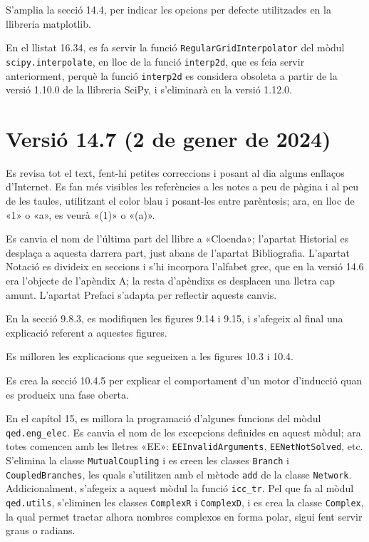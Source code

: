 S'amplia la secció 14.4, per indicar les opcions per defecte utilitzades en la llibreria matplotlib.

En el llistat 16.34, es fa servir la funció \texttt{RegularGridInterpolator} del mòdul \texttt{scipy.interpolate}, en lloc de la funció \texttt{interp2d}, que es feia servir anteriorment, perquè la funció \texttt{interp2d} es considera obsoleta a partir de la versió 1.10.0 de la llibreria SciPy, i s'eliminarà en la versió 1.12.0.


\section*{Versió 14.7 (2 de gener de 2024)}

Es revisa tot el text, fent-hi petites correccions i posant al dia alguns enllaços d'Internet. Es fan més visibles les referències a les notes a peu de pàgina i al peu de les taules, utilitzant el color blau i posant-les entre parèntesis; ara, en lloc de {\footnotesize«1»} o {\footnotesize«a»}, es veurà {\footnotesize\color{blue}«(1)»} o {\footnotesize\color{blue}«(a)»}.

Es canvia el nom de l'última part del llibre a «Cloenda»; l'apartat Historial es desplaça a aquesta darrera part, just abans de l'apartat Bibliografia. L'apartat Notació es divideix en seccions i s'hi incorpora l'alfabet grec, que en la versió 14.6 era l'objecte de l'apèndix A; la resta d'apèndixs es desplacen una lletra cap amunt. L'apartat Prefaci s'adapta per reflectir aquests canvis.

En la secció 9.8.3, es modifiquen les figures 9.14 i 9.15, i s'afegeix al final una explicació referent a aquestes figures.

Es  milloren les explicacions que segueixen a les figures 10.3 i 10.4.


Es crea la secció 10.4.5 per explicar el comportament d'un motor d'inducció quan es produeix una fase oberta.

En el capítol 15, es millora la programació d'algunes funcions del mòdul  \texttt{qed.eng\_elec}. Es canvia el nom de les excepcions definides en aquest mòdul; ara totes comencen amb les lletres «EE»: \texttt{EEInvalidArguments}, \texttt{EENetNotSolved}, etc. S'elimina la classe \texttt{MutualCoupling} i es creen les classes \texttt{Branch} i \texttt{CoupledBranches}, les quals s'utilitzen amb el mètode \texttt{add} de la classe \texttt{Network}. Addicionalment, s'afegeix a aquest mòdul la funció \texttt{icc\_tr}. Pel que fa al mòdul \texttt{qed.utils}, s'eliminen les classes \texttt{ComplexR} i \texttt{ComplexD}, i es crea la classe \texttt{Complex}, la qual permet tractar alhora nombres complexos en forma polar, sigui fent servir graus o radians.

